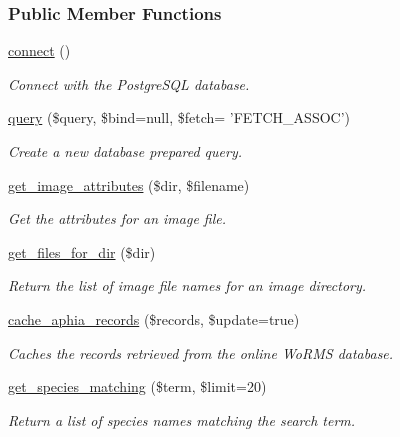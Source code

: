 \subsubsection*{Public Member Functions}
\begin{DoxyCompactItemize}
\item 
\hypertarget{classDatabase_a27f4e88bfd7fcd348e0f544170fb2fbe}{\hyperlink{classDatabase_a27f4e88bfd7fcd348e0f544170fb2fbe}{connect} ()}\label{classDatabase_a27f4e88bfd7fcd348e0f544170fb2fbe}

\begin{DoxyCompactList}\small\item\em Connect with the Postgre\-S\-Q\-L database. \end{DoxyCompactList}\item 
\hyperlink{classDatabase_a18962b53bf38e115cfca934bd2d63d3b}{query} (\$query, \$bind=null, \$fetch= 'F\-E\-T\-C\-H\-\_\-\-A\-S\-S\-O\-C')
\begin{DoxyCompactList}\small\item\em Create a new database prepared query. \end{DoxyCompactList}\item 
\hyperlink{classDatabase_af7bc1f009ae4cfec8a19ce4c1cc0a43a}{get\-\_\-image\-\_\-attributes} (\$dir, \$filename)
\begin{DoxyCompactList}\small\item\em Get the attributes for an image file. \end{DoxyCompactList}\item 
\hyperlink{classDatabase_a6cf70f0c423b4b32d9b2825c74152da4}{get\-\_\-files\-\_\-for\-\_\-dir} (\$dir)
\begin{DoxyCompactList}\small\item\em Return the list of image file names for an image directory. \end{DoxyCompactList}\item 
\hyperlink{classDatabase_a0fa69e8599adb5307cfc552ac9bf2c0d}{cache\-\_\-aphia\-\_\-records} (\$records, \$update=true)
\begin{DoxyCompactList}\small\item\em Caches the records retrieved from the online Wo\-R\-M\-S database. \end{DoxyCompactList}\item 
\hyperlink{classDatabase_a5972a2838b98ed0b7816a528ac823bec}{get\-\_\-species\-\_\-matching} (\$term, \$limit=20)
\begin{DoxyCompactList}\small\item\em Return a list of species names matching the search term. \end{DoxyCompactList}\item 

\end{DoxyCompactItemize}
